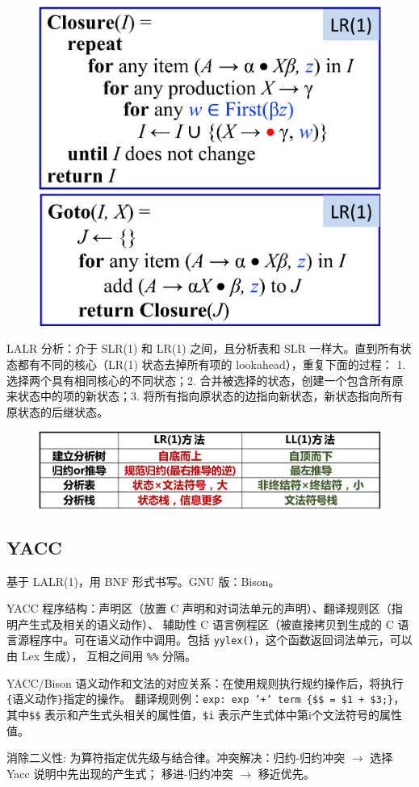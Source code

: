 \begin{figure}[H]
    \centering
    \includegraphics[width=0.48\linewidth]{figures/lr1-1.png}
    \includegraphics[width=0.48\linewidth]{figures/lr1-2.png}
\end{figure}

\par \noindent LALR 分析：介于 SLR(1) 和 LR(1) 之间，且分析表和 SLR 一样大。直到所有状态都有不同的核心（LR(1) 状态去掉所有项的 lookahead），重复下面的过程：
1. 选择两个具有相同核心的不同状态；2. 合并被选择的状态，创建一个包含所有原来状态中的项的新状态；3. 将所有指向原状态的边指向新状态，新状态指向所有原状态的后继状态。

\begin{figure}[H]
    \centering
    \includegraphics[width=\linewidth]{figures/parsing.png}
\end{figure}

\subsection*{YACC}
\par \noindent 基于 LALR(1)，用 BNF 形式书写。GNU 版：Bison。
\par \noindent YACC 程序结构：声明区（放置 C 声明和对词法单元的声明）、翻译规则区（指明产生式及相关的语义动作）、
辅助性 C 语言例程区（被直接拷贝到生成的 C 语言源程序中。可在语义动作中调用。包括 \texttt{yylex()}，这个函数返回词法单元，可以由 Lex 生成），
互相之间用 \texttt{\%\%} 分隔。
\par \noindent YACC/Bison 语义动作和文法的对应关系：在使用规则执行规约操作后，将执行\texttt{\{}语义动作\texttt{\}}指定的操作。
翻译规则例：\texttt{exp: exp '+' term \{\$\$ = \$1 + \$3;\}}，
其中\texttt{\$\$} 表示和产生式头相关的属性值，\texttt{\$i} 表示产生式体中第i个文法符号的属性值。
\par \noindent 消除二义性: 为算符指定优先级与结合律。冲突解决：归约-归约冲突 $\rightarrow$ 选择 Yacc 说明中先出现的产生式；
移进-归约冲突 $\rightarrow$ 移近优先。